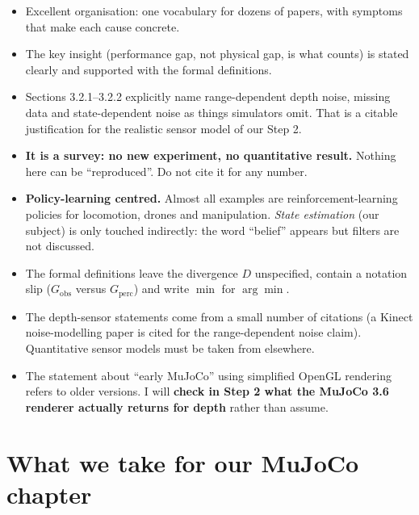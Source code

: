 \documentclass[11pt,a4paper]{article}
\begin{document}
\begin{warn}[Strengths]
\begin{itemize}
\item Excellent organisation: one vocabulary for dozens of papers, with symptoms that make each
cause concrete.
\item The key insight (performance gap, not physical gap, is what counts) is stated clearly and
supported with the formal definitions.
\item Sections 3.2.1--3.2.2 explicitly name range-dependent depth noise, missing data and
state-dependent noise as things simulators omit. That is a citable justification for the realistic
sensor model of our Step 2.
\end{itemize}
\end{warn}

\begin{warn}[Limitations]
\begin{itemize}
\item \textbf{It is a survey: no new experiment, no quantitative result.} Nothing here can be
``reproduced''. Do not cite it for any number.
\item \textbf{Policy-learning centred.} Almost all examples are reinforcement-learning policies for
locomotion, drones and manipulation. \emph{State estimation} (our subject) is only touched
indirectly: the word ``belief'' appears but filters are not discussed.
\item The formal definitions leave the divergence $D$ unspecified, contain a notation slip
($G_{\mathrm{obs}}$ versus $G_{\mathrm{perc}}$) and write $\min$ for $\arg\min$.
\item The depth-sensor statements come from a small number of citations (a Kinect noise-modelling
paper is cited for the range-dependent noise claim). Quantitative sensor models must be taken from
elsewhere.
\item The statement about ``early MuJoCo'' using simplified OpenGL rendering refers to older
versions. I will \textbf{check in Step 2 what the MuJoCo 3.6 renderer actually returns for depth}
rather than assume.
\end{itemize}
\end{warn}

\section{What we take for our MuJoCo chapter}
\end{document}
